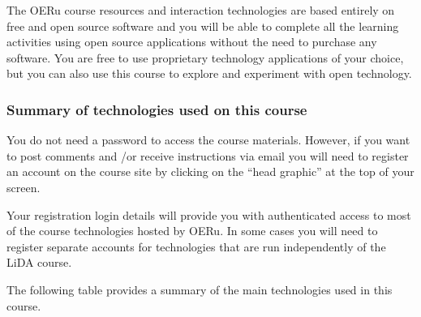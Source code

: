 \documentclass[
]{book}
\theoremstyle{definition}
\theoremstyle{definition}
\theoremstyle{definition}
\theoremstyle{definition}
\theoremstyle{remark}
\begin{document}
The OERu course resources and interaction technologies are based entirely on free and open source software and you will be able to complete all the learning activities using open source applications without the need to purchase any software. You are free to use proprietary technology applications of your choice, but you can also use this course to explore and experiment with open technology.

\hypertarget{summary-of-technologies-used-on-this-course}{%
\subsubsection*{Summary of technologies used on this course}\label{summary-of-technologies-used-on-this-course}}

You do not need a password to access the course materials. However, if you want to post comments and /or receive instructions via email you will need to register an account on the course site by clicking on the ``head graphic'' at the top of your screen.

Your registration login details will provide you with authenticated access to most of the course technologies hosted by OERu. In some cases you will need to register separate accounts for technologies that are run independently of the LiDA course.

The following table provides a summary of the main technologies used in this course.
\end{document}
